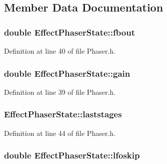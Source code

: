 \subsection{Member Data Documentation}
\subsubsection[{\texorpdfstring{fbout}{fbout}}]{\setlength{\rightskip}{0pt plus 5cm}double Effect\+Phaser\+State\+::fbout}\hypertarget{class_effect_phaser_state_a7974d3b9f85d2f1fa25d88a6128c589e}{}\label{class_effect_phaser_state_a7974d3b9f85d2f1fa25d88a6128c589e}


Definition at line 40 of file Phaser.\+h.

\subsubsection[{\texorpdfstring{gain}{gain}}]{\setlength{\rightskip}{0pt plus 5cm}double Effect\+Phaser\+State\+::gain}\hypertarget{class_effect_phaser_state_aae03ee826bbf579d4c0845c88c3ff37d}{}\label{class_effect_phaser_state_aae03ee826bbf579d4c0845c88c3ff37d}


Definition at line 39 of file Phaser.\+h.

\subsubsection[{\texorpdfstring{laststages}{laststages}}]{ Effect\+Phaser\+State\+::laststages}\hypertarget{class_effect_phaser_state_a96e59907a263530a5906b8a7848cd896}{}\label{class_effect_phaser_state_a96e59907a263530a5906b8a7848cd896}


Definition at line 44 of file Phaser.\+h.

\subsubsection[{\texorpdfstring{lfoskip}{lfoskip}}]{\setlength{\rightskip}{0pt plus 5cm}double Effect\+Phaser\+State\+::lfoskip}\hypertarget{class_effect_phaser_state_a443f58314ac5b40cda0ddf76db70e2a2}{}\label{class_effect_phaser_state_a443f58314ac5b40cda0ddf76db70e2a2}


